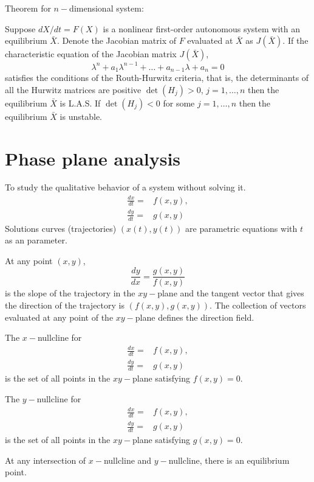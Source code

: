 Theorem for $n-$dimensional system:
\begin{theorem}
Suppose $dX/dt=F(X)$ is a nonlinear first-order autonomous system with an equilibrium $\bar X$. Denote the Jacobian matrix of $F$ evaluated at $\bar X$ as $J(\bar X)$. If the characteristic equation of the Jacobian matrix $J(\bar X)$,
$$\lambda ^n + a_1 \lambda ^{n-1}+\dots + a_{n-1}\lambda +a_n=0$$
satisfies the conditions of the Routh-Hurwitz criteria, that is, the determinants of all the Hurwitz matrices are positive $\det (H_j)>0$, $j=1,\dots,n$ then the equilibrium $\bar X$ is L.A.S. If $\det (H_j)<0$ for some $j=1,\dots , n$ then the equilibrium $\bar X$ is unstable.
\end{theorem}


\section{Phase plane analysis}
To study the qualitative behavior of a system without solving it.
$$
\begin{array}{ll}
\frac{dx}{dt}=& f(x,y),\\
\frac{dy}{dt}=& g(x,y)
\end{array}
$$
Solutions curves (trajectories) $(x(t),y(t))$ are parametric equations with $t$ as an parameter.

At any point $(x,y)$, 
$$\frac{dy}{dx}=\frac{g(x,y)}{f(x,y)}$$
is the slope of the trajectory in the $xy-$plane and the tangent vector that gives the direction of the trajectory is $(f(x,y),g(x,y))$. The collection of vectors evaluated at any point of the $xy-$plane defines the direction field.


\begin{definition}
The $x-$nullcline for
$$
\begin{array}{ll}
\frac{dx}{dt}=& f(x,y),\\
\frac{dy}{dt}=& g(x,y)
\end{array}
$$
is the set of all points in the $xy-$plane satisfying $f(x,y)=0$.

The $y-$nullcline for
$$
\begin{array}{ll}
\frac{dx}{dt}=& f(x,y),\\
\frac{dy}{dt}=& g(x,y)
\end{array}
$$
is the set of all points in the $xy-$plane satisfying $g(x,y)=0$.
\end{definition}

At any intersection of $x-$nullcline and $y-$nullcline, there is an equilibrium point.

